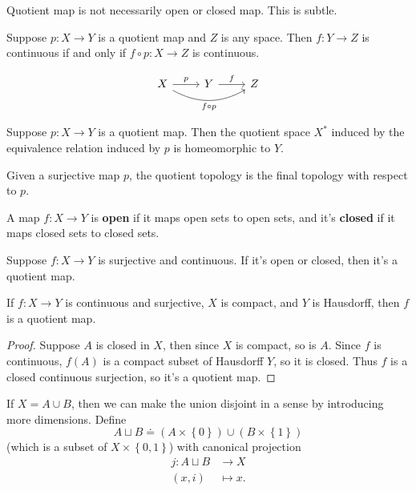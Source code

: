 \documentclass[twoside,10pt]{report}
\begin{document}
{\color{red}Quotient map is not necessarily open or closed map. This is subtle.}

\begin{prop}
Suppose $p:X\to Y$ is a quotient map and $Z$ is any space. Then $f:Y\to Z$ is continuous if and only if $f \circ p:X \to Z$ is continuous.
\end{prop}
\[
\begin{tikzcd}
	X \rar{p}\arrow[rr,bend right,"f \circ p"'] & Y \rar{f} & Z
\end{tikzcd}
\] 

\begin{thrm}[]
Suppose $p:X\to Y$ is a quotient map. Then the quotient space $X^{*}$ induced by the equivalence relation induced by $p$ is homeomorphic to $Y$.
\end{thrm}

\begin{note}[]
	Given a surjective map $p$, the quotient topology is the final topology with respect to $p$.
\end{note}

\begin{defn}[]
A map $f:X\to Y$ is \textbf{open} if it maps open sets to open sets, and it's \textbf{closed} if it maps closed sets to closed sets.
\end{defn}

\begin{prop}
Suppose $f:X\to Y$ is surjective and continuous. If it's open or closed, then it's a quotient map.
\end{prop}

\begin{cor}
If $f:X\to Y$ is continuous and surjective, $X$ is compact, and $Y$ is Hausdorff, then $f$ is a quotient map.
\end{cor}
\begin{proof}
	Suppose $A$ is closed in $X$, then since $X$ is compact, so is $A$. Since $f$ is continuous, $f(A)$ is a compact subset of Hausdorff $Y$, so it is closed. Thus $f$ is a closed continuous surjection, so it's a quotient map.
\end{proof}

If $X = A \cup B$, then we can make the union disjoint in a sense by introducing more dimensions. Define
\[
	A \sqcup B \doteq (A \times \left\{ 0 \right\}) \cup (B \times \left\{ 1 \right\})
\] (which is a subset of $X \times \left\{ 0,1 \right\}$) with canonical projection
\begin{align*}
	j: A \sqcup B &\to X \\
	(x,i)&\mapsto x.
\end{align*}
\end{document}
